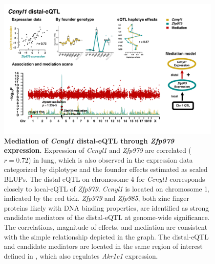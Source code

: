 \documentclass[9pt,twocolumn,twoside]{gsajnl}
\begin{document}
\begin{figure}[hp]
\renewcommand{\familydefault}{\sfdefault}\normalfont
\centering
\includegraphics[width=\textwidth, trim={0in 0.5in 0in 0in}, clip]{figs/ccnyl1_mediation.pdf}
\caption{\textbf{Mediation of \textit{Ccnyl1} distal-eQTL through \textit{Zfp979} expression.} Expression of \textit{Ccnyl1} and \textit{Zfp979} are correlated ($r = 0.72$) in lung, which is also observed in the expression data categorized by diplotype and the founder effects estimated as scaled BLUPs. The distal-eQTL on chromosome 4 for \textit{Ccnyl1} corresponds closely to local-eQTL of \textit{Zfp979}. \textit{Ccnyl1} is located on chromosome 1, indicated by the red tick. \textit{Zfp979} and \textit{Zfp985}, both zinc finger proteins likely with DNA binding properties, are identified as strong candidate mediators of the distal-eQTL at genome-wide significance. The correlations, magnitude of effects, and mediation are consistent with the simple relationship depicted in the graph. The distal-eQTL and candidate mediators are located in the same region of interest defined in \cite{HamiltonWilliams2013}, which also regulates \textit{Akr1e1} expression. 
\label{fig:ccnyl1_exmediation}}
\end{figure}

\clearpage
\end{document}
